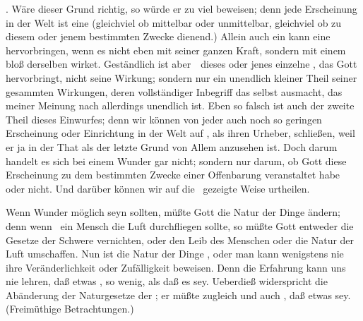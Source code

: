 . Wäre dieser Grund richtig, so würde er zu viel beweisen; denn jede Erscheinung in der Welt ist eine  (gleichviel ob mittelbar oder unmittelbar, gleichviel ob zu diesem oder jenem bestimmten Zwecke dienend.) Allein auch ein  kann eine  hervorbringen, wenn es nicht eben mit seiner ganzen Kraft, sondern mit einem bloß  derselben wirket. Geständlich ist aber~\ dieses oder jenes einzelne , das Gott hervorbringt, nicht seine  Wirkung; sondern nur ein unendlich kleiner Theil seiner gesammten Wirkungen, deren vollständiger Inbegriff das  selbst ausmacht, das meiner Meinung nach allerdings unendlich ist. Eben so falsch ist auch der zweite Theil dieses Einwurfes; denn wir können von jeder auch noch so geringen Erscheinung oder Einrichtung in der Welt auf , als ihren Urheber, schließen, weil er ja in der That als der letzte Grund von Allem anzusehen ist. Doch darum handelt es sich bei einem Wunder gar nicht; sondern nur darum, ob Gott diese Erscheinung zu dem bestimmten Zwecke einer Offenbarung veranstaltet habe oder nicht. Und darüber können wir auf die \ gezeigte Weise urtheilen.\par
{} Wenn Wunder möglich seyn sollten, müßte Gott die Natur der Dinge ändern; denn wenn \zB\ ein Mensch die Luft durchfliegen sollte, so müßte Gott entweder die Gesetze der Schwere vernichten, oder den Leib des Menschen oder die Natur der Luft umschaffen. Nun ist die Natur der Dinge , oder man kann wenigstens nie ihre Veränderlichkeit oder Zufälligkeit beweisen. Denn die Erfahrung kann uns nie lehren, daß etwas , so wenig, als daß es  sey. Ueberdieß widerspricht die Abänderung der Naturgesetze der ; er müßte zugleich  und auch , daß etwas sey. (Freimüthige Betrachtungen.)\par
